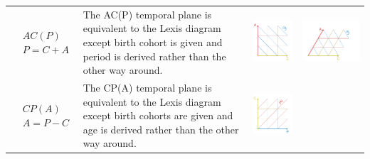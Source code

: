 \documentclass[12pt,oneside,a4paper]{article} %
\begin{document}
\begin{longtable}{m{}m{}m{}m{}}
  \\
  $$\begin{aligned}
    &AC(P) \\
    &P = C + A
  \end{aligned}$$ &
  The AC(P) temporal plane is equivalent to the Lexis diagram except birth
  cohort is given and period is derived rather than the other way around. &
  \includegraphics[scale=.5]{Figures/DiagramTable/AC_rt.pdf} & 
  \includegraphics[scale=.5]{Figures/DiagramTable/AC_iso.pdf}  \\
  $$\begin{aligned}
    &CP(A) \\
    &A = P - C
  \end{aligned}$$ &
  The CP(A) temporal plane is equivalent to the Lexis diagram except birth
  cohorts are given and age is derived rather than the other way around. &
  \includegraphics[scale=.5]{Figures/DiagramTable/CP_rt.pdf} & 

\end{longtable}
\end{document}

